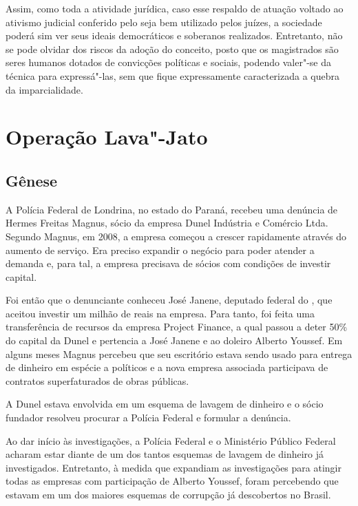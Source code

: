 Assim, como toda a atividade jurídica, caso esse respaldo de atuação
voltado ao ativismo judicial conferido pelo  seja bem utilizado
pelos juízes, a sociedade poderá sim ver seus ideais democráticos e
soberanos realizados. Entretanto, não se pode olvidar dos riscos da
adoção do conceito, posto que os magistrados são seres humanos dotados
de convicções políticas e sociais, podendo valer"-se da técnica para
expressá"-las, sem que fique expressamente caracterizada a quebra da
imparcialidade.

\section{Operação Lava"-Jato}

\subsection{Gênese}

A Polícia Federal de Londrina, no estado do Paraná, recebeu uma denúncia
de Hermes Freitas Magnus, sócio da empresa Dunel Indústria e Comércio
Ltda. Segundo Magnus, em 2008, a empresa começou a crescer rapidamente
através do aumento de serviço. Era preciso expandir o negócio para poder
atender a demanda e, para tal, a empresa precisava de sócios com
condições de investir capital.

Foi então que o denunciante conheceu José Janene, deputado federal do
, que aceitou investir um milhão de reais na empresa. Para tanto,
foi feita uma transferência de recursos da empresa  Project Finance,
a qual passou a deter 50\% do capital da Dunel e pertencia a José Janene
e ao doleiro Alberto Youssef. Em alguns meses Magnus percebeu que seu
escritório estava sendo usado para entrega de dinheiro em espécie a
políticos e a nova empresa associada participava de contratos
superfaturados de obras públicas.

A Dunel estava envolvida em um esquema de lavagem de dinheiro e o sócio
fundador resolveu procurar a Polícia Federal e formular a denúncia.

Ao dar início às investigações, a Polícia Federal e o Ministério Público
Federal acharam estar diante de um dos tantos esquemas de lavagem de
dinheiro já investigados. Entretanto, à medida que expandiam as
investigações para atingir todas as empresas com participação de Alberto
Youssef, foram percebendo que estavam em um dos maiores esquemas de
corrupção já descobertos no Brasil.

